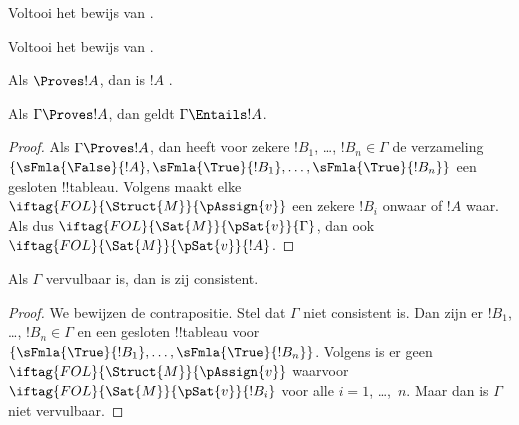\documentclass[../../../include/open-logic-section]{subfiles}
\begin{document}
\begin{prob}
Voltooi het bewijs van .
\end{prob}
\tagendprob

\begin{prob}
Voltooi het bewijs van .
\end{prob}
\tagendprob

\begin{cor}
Als $\Proves !A$, dan is $!A$ .
\end{cor}

\begin{cor}
Als $\Gamma \Proves !A$, dan geldt $\Gamma \Entails !A$.
\end{cor}

\begin{proof}
  Als $\Gamma \Proves !A$, dan heeft voor zekere $!B_1$, \dots,
  $!B_n \in \Gamma$ de verzameling
  $\{\sFmla{\False}{!A}, \sFmla{\True}{!B_1}, \dots,
  \sFmla{\True}{!B_n}\}$ een gesloten !!{tableau}. Volgens
   maakt elke
  ~$\iftag{FOL}{\Struct{M}}{\pAssign{v}}$
  een zekere $!B_i$ onwaar of $!A$ waar. Als dus
  $\iftag{FOL}{\Sat{M}}{\pSat{v}}{\Gamma}$, dan ook
  $\iftag{FOL}{\Sat{M}}{\pSat{v}}{!A}$.
\end{proof}

\begin{cor}
Als $\Gamma$ vervulbaar is, dan is zij consistent.
\end{cor}

\begin{proof}
We bewijzen de contrapositie. Stel dat $\Gamma$ niet consistent is.
Dan zijn er $!B_1$, \dots, $!B_n \in \Gamma$ en een gesloten
!!{tableau} voor $\{\sFmla{\True}{!B_1}, \dots, \sFmla{\True}{!B_n}\}$.
Volgens  is er geen
$\iftag{FOL}{\Struct{M}}{\pAssign{v}}$ waarvoor
$\iftag{FOL}{\Sat{M}}{\pSat{v}}{!B_i}$ voor alle $i=1$, \dots,~$n$.
Maar dan is $\Gamma$ niet vervulbaar.
\end{proof}
\end{document}
